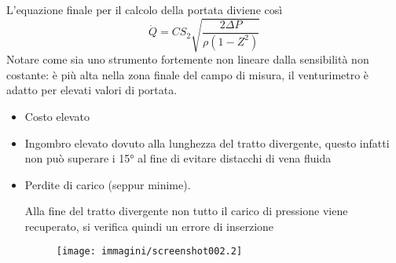 \documentclass[a4paper, 15pt]{article}
\newcommand{\xmark}{\ding{55}}
\begin{document}
\begin{adjustwidth}{2in}{}
	L'equazione finale per il calcolo della portata diviene così 
	\[\dot{Q} = CS_2\sqrt{\dfrac{2\Delta P}{\rho(1-Z^2)}}\]
	Notare come sia uno strumento fortemente non lineare dalla sensibilità non costante: è più alta nella zona finale del campo di misura, il venturimetro è adatto per elevati valori di portata.
	\begin{itemize}[label = \textcolor{red}{\xmark}]
		\item Costo elevato
		\item Ingombro elevato dovuto alla lunghezza del tratto divergente, questo infatti non può superare i 15\unit{\degree} al fine di evitare distacchi di vena fluida
		\item Perdite di carico (seppur minime).
		
		Alla fine del tratto divergente non tutto il carico di pressione viene
		recuperato, si verifica quindi un errore di inserzione
		\begin{figure}[H]
			\centering
			\texttt{[image: immagini/screenshot002.2]}
			\label{fig:screenshot002}
		\end{figure}		
	\end{itemize}
\end{adjustwidth}
\end{document}
